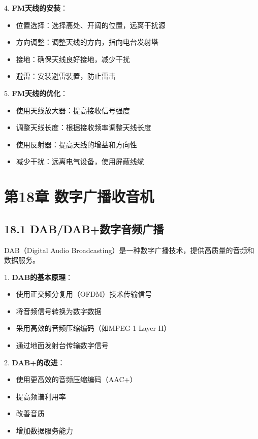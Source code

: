 \documentclass[12pt,UTF8]{ctexbook}
\begin{document}
4. \textbf{FM天线的安装}：
   \begin{itemize}[leftmargin=3.5em]
   \item 位置选择：选择高处、开阔的位置，远离干扰源
   \item 方向调整：调整天线的方向，指向电台发射塔
   \item 接地：确保天线良好接地，减少干扰
   \item 避雷：安装避雷装置，防止雷击
   \end{itemize}

5. \textbf{FM天线的优化}：
   \begin{itemize}[leftmargin=3.5em]
   \item 使用天线放大器：提高接收信号强度
   \item 调整天线长度：根据接收频率调整天线长度
   \item 使用反射器：提高天线的增益和方向性
   \item 减少干扰：远离电气设备，使用屏蔽线缆
   \end{itemize}

\chapter*{第18章 数字广播收音机}
\section*{18.1 DAB/DAB+数字音频广播}

DAB（Digital Audio Broadcasting）是一种数字广播技术，提供高质量的音频和数据服务。

1. \textbf{DAB的基本原理}：
   \begin{itemize}[leftmargin=3.5em]
   \item 使用正交频分复用（OFDM）技术传输信号
   \item 将音频信号转换为数字数据
   \item 采用高效的音频压缩编码（如MPEG-1 Layer II）
   \item 通过地面发射台传输数字信号
   \end{itemize}

2. \textbf{DAB+的改进}：
   \begin{itemize}[leftmargin=3.5em]
   \item 使用更高效的音频压缩编码（AAC+）
   \item 提高频谱利用率
   \item 改善音质
   \item 增加数据服务能力
   \end{itemize}
\end{document}
